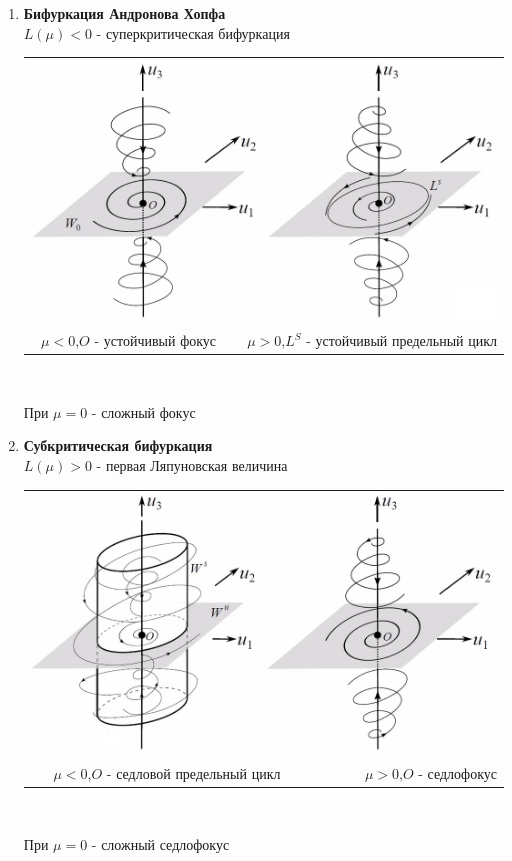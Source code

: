 \begin{multicols*}{2}
\begin{enumerate}
			\item \textbf{Бифуркация Андронова Хопфа} \\
			$L(\mu)<0$ - суперкритическая бифуркация \\

			\begin{tabular}{cr}
				\multicolumn{2}{c}{\includegraphics[width=0.9\linewidth]{tk_img/14_5.png}} \\
				$\mu<0$,\quad $O$ - устойчивый фокус & $\mu>0$,\quad $L^S$ - устойчивый предельный цикл\\
			\end{tabular}\\
			\begin{center}
				При $\mu=0$ - сложный фокус
			\end{center}

			
			\item \textbf{Субкритическая бифуркация} \\
			$L(\mu)>0$ - первая Ляпуновская величина \\

			\begin{tabular}{cr}
				\multicolumn{2}{c}{\includegraphics[width=0.9\linewidth]{tk_img/14_6.png}} \\
				$\mu<0$,\quad $O$ - седловой предельный цикл & $\mu>0$,\quad $O$ - седлофокус\\
			\end{tabular}\\
			\begin{center}
				При $\mu=0$ - сложный седлофокус
			\end{center}
			

\end{enumerate}
\end{multicols*}
